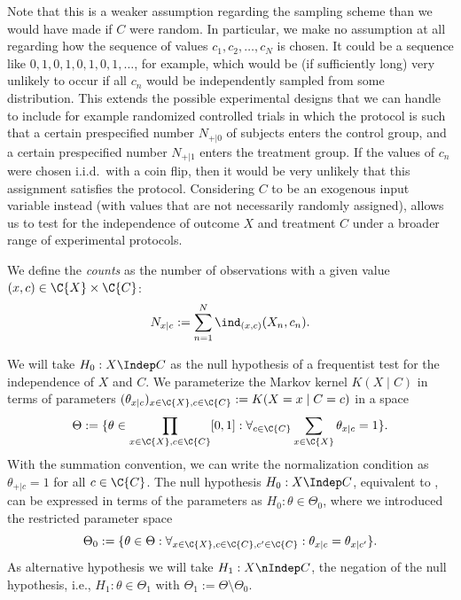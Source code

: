 Note that this is a weaker assumption regarding the sampling scheme than
we would have made if $C$ were random. In particular, we make no assumption
at all regarding how the sequence of values $c_1,c_2,\dots,c_N$ is chosen.
It could be a sequence like $0,1,0,1,0,1,0,1,\dots$, for example, which would
be (if sufficiently long) very unlikely to occur if all $c_n$ would be independently
sampled from some distribution. This extends the possible experimental designs that
we can handle to include for example randomized controlled trials in which the 
protocol is such that a certain prespecified number $N_{+|0}$ of subjects enters the control
group, and a certain prespecified number $N_{+|1}$ enters the treatment group. If the values
of $c_n$ were chosen i.i.d.\ with a coin flip, then it would be very unlikely that
this assignment satisfies the protocol. Considering $C$ to be an exogenous input
variable instead (with values that are not necessarily randomly assigned), allows us to test for the 
independence of outcome $X$ and treatment $C$ under a broader range of experimental
protocols.

We define the \emph{counts} as the number of observations with a given value $(x,c)\in\C{X}\times\C{C}$:
$$N_{x|c} := \sum_{n=1}^N \ind_{(x,c)}(X_n,c_n).$$

We will take $H_0 : X \Indep C$ as the null hypothesis of a frequentist test for the independence of $X$ and $C$.
We parameterize the Markov kernel $K(X \mid C)$ in terms of parameters
$(\theta_{x|c})_{x\in\C{X},c\in\C{C}} := K(X = x \mid C = c)$ in a space
$$\Theta := %
\{ \theta \in \prod_{x\in\C{X},c\in\C{C}} [0,1] : \forall_{c\in\C{C}} \sum_{x\in\C{X}} \theta_{x|c} = 1\}.$$
With the summation convention, we can write the normalization condition as $\theta_{+|c} = 1$ for all $c \in \C{C}$.
The null hypothesis $H_0 : X \Indep C$, equivalent to , can be expressed
in terms of the parameters as $H_0 : \theta \in \Theta_0$, where we introduced the restricted parameter space
$$\Theta_0 := \{ \theta \in \Theta : \forall_{x\in\C{X},c\in\C{C},c'\in\C{C}}: \theta_{x|c} = \theta_{x|c'} \}.$$
As alternative hypothesis we will take $H_1 : X \nIndep C$, the negation of the null hypothesis, i.e.,
$H_1 : \theta \in \Theta_1$ with $\Theta_1 := \Theta \setminus \Theta_0$.

